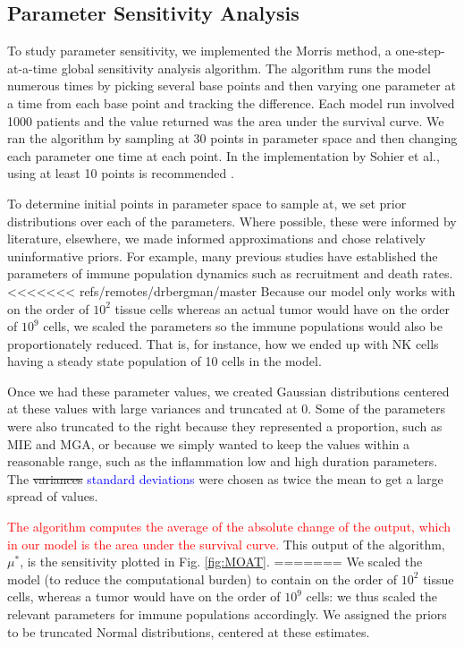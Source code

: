 \documentclass[11pt]{article}
\newcommand{\tcr} { \textcolor{red} }
\newcommand{\tcb} { \textcolor{blue} }
\begin{document}
\subsection{Parameter Sensitivity Analysis}
To study parameter sensitivity, we implemented the Morris method, a one-step-at-a-time global sensitivity analysis algorithm.
The algorithm runs the model numerous times by picking several base points and then varying one parameter at a time from each base point and tracking the difference\cite{morris1991factorial, sohier2014improvement}.
Each model run involved 1000 patients and the value returned was the area under the survival curve.
We ran the algorithm by sampling at 30 points in parameter space and then changing each parameter one time at each point.
In the implementation by Sohier et al., using at least 10 points is recommended \cite{sohier2014improvement}.
\par
To determine initial points in parameter space to sample at, we set prior distributions over each of the parameters.
Where possible, these were informed by literature, elsewhere, we made informed approximations and chose relatively uninformative priors.
For example, many previous studies have established the parameters of immune population dynamics such as recruitment and death rates\cite{de2014modeling}.
<<<<<<< refs/remotes/drbergman/master
Because our model only works with on the order of $10^2$ tissue cells whereas an actual tumor would have on the order of $10^9$ cells\cite{de2014modeling}, we scaled the parameters so the immune populations would also be proportionately reduced.
That is, for instance, how we ended up with NK cells having a steady state population of 10 cells in the model.
\par
Once we had these parameter values, we created Gaussian distributions centered at these values with large variances and truncated at 0.
Some of the parameters were also truncated to the right because they represented a proportion, such as MIE and MGA, or because we simply wanted to keep the values within a reasonable range, such as the inflammation low and high duration parameters.
The \sout{variances} \tcb{standard deviations} were chosen as twice the mean to get a large spread of values.
\par
\tcr{The algorithm computes the average of the absolute change of the output, which in our model is the area under the survival curve.}
This output of the algorithm, $\mu^*$, is the sensitivity plotted in Fig. \ref{fig:MOAT}.
=======
We scaled the model (to reduce the computational burden) to contain on the order of $10^2$ tissue cells, whereas a tumor would have on the order of $10^9$ cells\cite{de2014modeling}: we thus scaled the relevant parameters for immune populations accordingly. We assigned the priors to be truncated Normal distributions, centered at these estimates.
\end{document}
